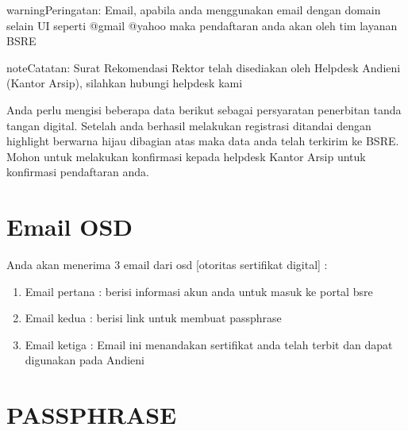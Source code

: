 \documentclass[letterpaper,10pt,bahasai]{sphinxmanual}
\begin{document}
\begin{sphinxadmonition}{warning}{Peringatan:}
Email, apabila anda menggunakan email dengan domain selain UI seperti @gmail @yahoo maka pendaftaran anda akan  oleh tim layanan BSRE
\end{sphinxadmonition}

\begin{sphinxadmonition}{note}{Catatan:}
Surat Rekomendasi Rektor telah disediakan oleh Helpdesk Andieni (Kantor Arsip), silahkan hubungi helpdesk kami
\end{sphinxadmonition}

Anda perlu mengisi beberapa data berikut sebagai persyaratan penerbitan tanda tangan digital. Setelah anda berhasil
melakukan registrasi  ditandai dengan highlight berwarna hijau dibagian atas 
maka data anda telah terkirim ke BSRE. Mohon untuk melakukan konfirmasi  kepada helpdesk Kantor Arsip untuk
konfirmasi pendaftaran anda.


\section{Email OSD}
\label{\detokenize{daftar_eSign:email-osd}}
Anda akan menerima 3 email dari osd {[}otoritas sertifikat digital{]} :
\begin{enumerate}
%
\item {} 
Email pertana \sphinxhyphen{}  : berisi informasi akun anda untuk masuk ke portal bsre

\item {} 
Email kedua \sphinxhyphen{}  : berisi link untuk membuat passphrase

\item {} 
Email ketiga \sphinxhyphen{}  : Email ini menandakan sertifikat anda telah terbit dan dapat digunakan pada Andieni

\end{enumerate}

\noindent{}


\section{PASSPHRASE}
\label{\detokenize{daftar_eSign:passphrase}}
\noindent{}
\end{document}
